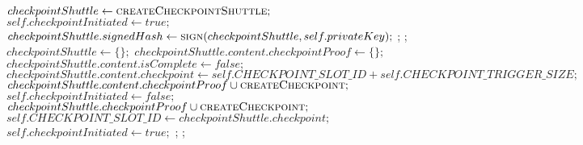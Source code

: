 \begin{algorithmic}[1]
 
    \State $checkpointShuttle \gets \Call{createCheckpointShuttle}{};$
    \State $self.checkpointInitiated \gets true;$
    \State $checkpointShuttle.signedHash \gets \Call{sign}{checkpointShuttle, self.privateKey};$
    \State {};
    \State {};
\EndFunction
\\

 
    \State $checkpointShuttle \gets \{\};$
    \State $checkpointShuttle.content.checkpointProof \gets \{\};$
    \State $checkpointShuttle.content.isComplete \gets false;$
    \State $checkpointShuttle.content.checkpoint \gets self.CHECKPOINT\_SLOT\_ID + self.CHECKPOINT\_TRIGGER\_SIZE;$
    \State $checkpointShuttle.content.checkpointProof \cup \Call{createCheckpoint}{};$
\EndFunction
\\

 
            \State {}
            \State $self.checkpointInitiated \gets false;$
            \State {}
        \Else 
            \State $checkpointShuttle.checkpointProof \cup \Call{createCheckpoint}{};$
             \State $self.CHECKPOINT\_SLOT\_ID \gets checkpointShuttle.checkpoint;$
            \State $self.checkpointInitiated \gets true;$
            \State {};
            \State {};
        \EndIf
    \EndIf
\EndFunction
\\

\end{algorithmic}